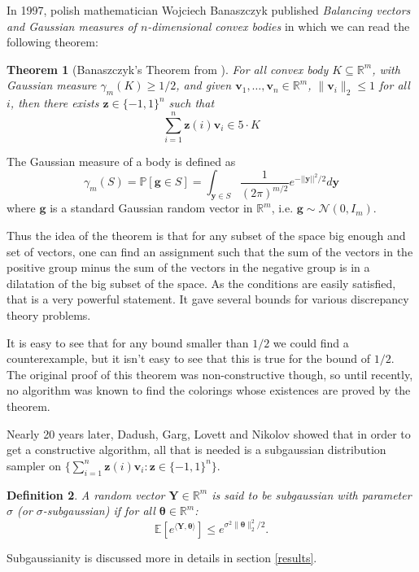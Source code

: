 \documentclass[12pt]{article}
\newtheorem{theorem}{Theorem}
\newtheorem{definition}[theorem]{Definition}
\begin{document}
In 1997, polish mathematician Wojciech Banaszczyk published \textit{Balancing vectors and Gaussian measures of $n$-dimensional convex bodies}\cite{banaszczyk1998balancing} in which we can read the following theorem:
\begin{theorem}[Banaszczyk's Theorem from \cite{banaszczyk1998balancing}]\label{banaszczyk}
For all convex body $K \subseteq \mathbb{R}^m$, with Gaussian measure $\gamma_m(K)\geq 1/2$, and given $\textbf{v}_1, \dots, \textbf{v}_n \in \mathbb{R}^m$, $\|\textbf{v}_i\|_2 \leq 1$ for all $i$, then there exists $ \textbf{z} \in \{-1, 1\}^n$ such that
$$\sum_{i=1}^n \textbf{z}(i)\textbf{v}_i \in 5 \cdot K $$
\end{theorem}
The Gaussian measure of a body is defined as $$\gamma_m(S) = \mathbb{P}[\textbf{g} \in S] = \int_{\textbf{y} \in S} \frac{1}{(2 \pi)^{m/2}} e^{-||\textbf{y}||^2/2} d\textbf{y}$$ where $\textbf{g}$ is a standard Gaussian random vector in $\mathbb{R}^m$, i.e. $\textbf{g} \sim \mathcal{N}(0, I_m)$. 

Thus the idea of the theorem is that for any subset of the space big enough and set of vectors, one can find an assignment such that the sum of the vectors in the positive group minus the sum of the vectors in the negative group is in a dilatation of the big subset of the space. As the conditions are easily satisfied, that is a very powerful statement. It gave several bounds for various discrepancy theory problems.

It is easy to see that for any bound smaller than $1/2$ we could find a counterexample, but it isn't easy to see that this is true for the bound of $1/2$. The original proof of this theorem was non-constructive though, so until recently, no algorithm was known to find the colorings whose existences are proved by the theorem. 

Nearly 20 years later, Dadush, Garg, Lovett and Nikolov showed that in order to get a constructive algorithm, all that is needed is a subgaussian distribution sampler on $\{\sum_{i=1}^n\textbf{z}(i)\textbf{v}_i:\textbf{z}\in\{-1,1\}^n\}$.
\begin{definition}\label{def_subgaussianity_intro}
A random vector $\textbf{Y} \in \mathbb{R}^m$ is said to be subgaussian with parameter $\sigma$ (or $\sigma$-subgaussian) if for all $\bm{\theta} \in \mathbb{R}^m$:
$$\mathbb{E}\left[e^{\langle\textbf{Y},\bm{\theta}\rangle}\right]\leq e^{\sigma^2\|\bm{\theta}\|_2^2/2}.$$
\end{definition}
Subgaussianity is discussed more in details in section \ref{results}.
\end{document}
